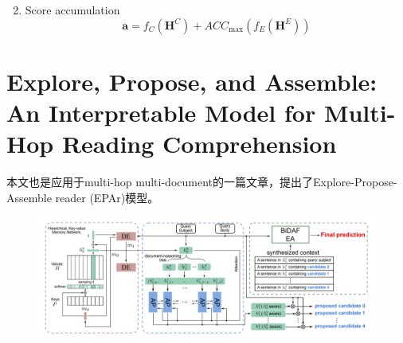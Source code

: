 \documentclass[a4paper,UTF8]{article}
\numberwithin{equation}{section}
\begin{document}
\begin{enumerate}
\begin{equation}
			\end{equation}
	\item Score accumulation\\
	\begin{equation}
		\mathbf{a}=f_{C}\left(\mathbf{H}^{C}\right)+A C C_{\max }\left(f_{E}\left(\mathbf{H}^{E}\right)\right)
		\end{equation}
\end{enumerate}

\newpage
\section{Explore, Propose, and Assemble:
An Interpretable Model for Multi-Hop Reading Comprehension}
本文也是应用于multi-hop multi-document的一篇文章，提出了Explore-Propose-Assemble reader (EPAr)模型。
\begin{figure}[H]
	\centering
	\includegraphics[width=\textwidth]{7-1.png}
\end{figure}
\end{document}
